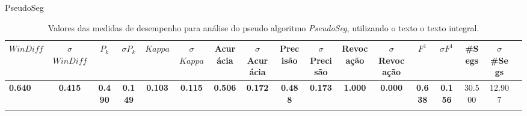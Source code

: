  \center PseudoSeg
\begin{longtable}[c]{|l|c|c|c|c|c|c|c|c|c|c|c|c|c|c|c|c|} 
\hline 
 $WinDiff$ & $\sigma$$WinDiff$ & $P_k$ & $\sigma$$P_k$ & $Kappa$ & $\sigma$$Kappa$ & Acurácia & $\sigma$Acurácia & Precisão & $\sigma$Precisão & Revocação & $\sigma$Revocação & $F^1$ & $\sigma$$F^1$ & \#Segs & $\sigma$\#Segs\\ \hline 
 \cellcolor{gray!20} \textbf{0.640} & \cellcolor{gray!20} \textbf{0.415} & \cellcolor{gray!20} \textbf{0.490} & \cellcolor{gray!20} \textbf{0.149} & \cellcolor{gray!20} \textbf{0.103} & \cellcolor{gray!20} \textbf{0.115} & \cellcolor{gray!20} \textbf{0.506} & \cellcolor{gray!20} \textbf{0.172} & \cellcolor{gray!20} \textbf{0.488} & \cellcolor{gray!20} \textbf{0.173} & \cellcolor{gray!20} \textbf{1.000} & \cellcolor{gray!20} \textbf{0.000} & \cellcolor{gray!20} \textbf{0.638} & \cellcolor{gray!20} \textbf{0.156} & 30.500 & 12.907  \\ \hline 
 \caption{Valores das medidas de desempenho para análise do pseudo algoritmo \textit{PseudoSeg}, utilizando o texto o texto integral.}
 \end{longtable} 
 
